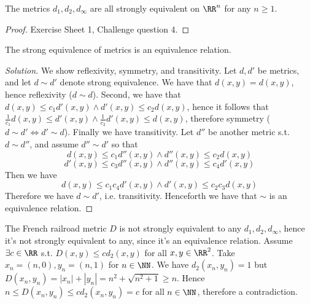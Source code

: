 \begin{theorem}
  The metrics $d_1,d_2,d_{\infty}$ are all strongly equivalent on $\RR^n$ for
  any $n\geq 1$.
  \label{thm:d1d2d8StrongEquivalence}
\end{theorem}
\begin{proof}
  Exercise Sheet 1, Challenge question 4.
\end{proof}
\begin{exercise}
  The strong equivalence of metrics is an equivalence relation.
\end{exercise}
\begin{proof}[Solution]
  We show reflexivity, symmetry, and transitivity. Let $d,d'$ be metrics, and
  let $d\sim d'$ denote strong equivalence. We have that $d(x,y)=d(x,y)$, hence
  reflexivity ($d\sim d$). Second, we have that $d(x,y)\leq c_1d'(x,y) \land d'(x,y)\leq
  c_2d(x,y)$, hence it follows that $\frac{1}{c_1}d(x,y)\leq d'(x,y) \land
  \frac{1}{c_2}d'(x,y)\leq d(x,y)$, therefore symmetry ($d\sim d' \iff d'\sim
  d$). Finally we have transitivity. Let $d''$ be another metric s.t. $d\sim
  d''$, and assume $d''\sim d'$ so that 
  \[d(x,y)\leq c_1 d''(x,y) \land d''(x,y) \leq c_2 d(x,y)\]
  \[d'(x,y)\leq c_3 d''(x,y) \land d''(x,y) \leq c_4 d'(x,y)\]
  Then we have 
  \[d(x,y)\leq c_1c_4 d'(x,y) \land d'(x,y) \leq c_2c_3d(x,y)\]
  Therefore we have $d\sim d'$, i.e. transitivity. Henceforth we have that
  $\sim$ is an equivalence relation.
\end{proof}
\begin{example}
  The French railroad metric $D$ is not strongly equivalent to any
  $d_1,d_2,d_{\infty}$, hence it's not strongly equivalent to any, since it's an
  equivalence relation. Assume $\exists c\in\RR$ s.t. $D(x,y)\leq cd_2(x,y)$ for
  all $x,y\in\RR^2$. Take $x_n=(n,0), y_n=(n,1)$ for $n\in\NN$. We have
  $d_2(x_n,y_n)=1$ but $D(x_n,y_n)=|x_n|+|y_n|=n^2+\sqrt{n^2+1}\geq n$. Hence
  $n\leq D(x_n,y_n) \leq cd_2(x_n,y_n)=c$ for all $n\in\NN$, therefore a
  contradiction.
\end{example}
